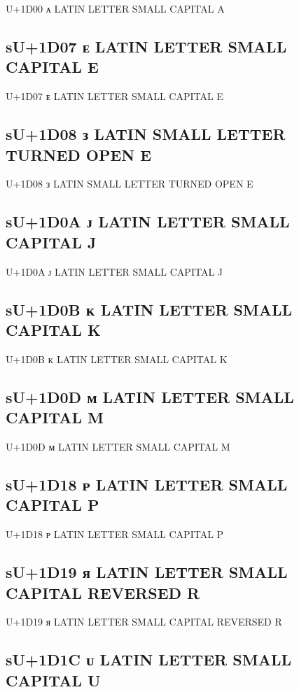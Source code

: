 U+1D00 ᴀ LATIN LETTER SMALL CAPITAL A

\subsection{sU+1D07 ᴇ LATIN LETTER SMALL CAPITAL E}

U+1D07 ᴇ LATIN LETTER SMALL CAPITAL E

\subsection{sU+1D08 ᴈ LATIN SMALL LETTER TURNED OPEN E}

U+1D08 ᴈ LATIN SMALL LETTER TURNED OPEN E

\subsection{sU+1D0A ᴊ LATIN LETTER SMALL CAPITAL J}

U+1D0A ᴊ LATIN LETTER SMALL CAPITAL J

\subsection{sU+1D0B ᴋ LATIN LETTER SMALL CAPITAL K}

U+1D0B ᴋ LATIN LETTER SMALL CAPITAL K

\subsection{sU+1D0D ᴍ LATIN LETTER SMALL CAPITAL M}

U+1D0D ᴍ LATIN LETTER SMALL CAPITAL M

\subsection{sU+1D18 ᴘ LATIN LETTER SMALL CAPITAL P}

U+1D18 ᴘ LATIN LETTER SMALL CAPITAL P

\subsection{sU+1D19 ᴙ LATIN LETTER SMALL CAPITAL REVERSED R}

U+1D19 ᴙ LATIN LETTER SMALL CAPITAL REVERSED R

\subsection{sU+1D1C ᴜ LATIN LETTER SMALL CAPITAL U}

